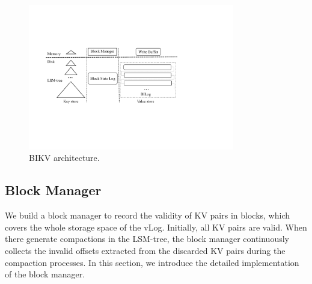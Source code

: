 \documentclass[sigconf]{acmart}
\begin{document}

\begin{figure}[!t]
	\setlength{\abovecaptionskip}{0.cm}	
	\setlength{\belowcaptionskip}{-0.cm}
	\centerline{\includegraphics[width=90mm]{bikv.pdf}}
	\caption{BIKV architecture.}
	\label{fig:bikv}
\end{figure}

\subsection{Block Manager} \label{ss1}
We build a block manager to record the validity of KV pairs in blocks, which covers the whole storage space of the vLog. Initially, all KV pairs are valid. When there generate compactions in the LSM-tree, the block manager continuously collects the invalid offsets extracted from the discarded KV pairs during the compaction processes. In this section, we introduce the detailed implementation of the block manager.
\end{document}
